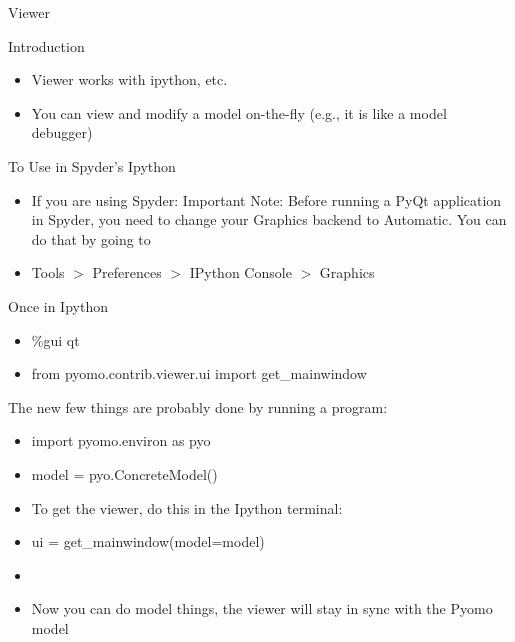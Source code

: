 \documentclass{beamer}
\begin{document}
\begin{frame}{}

\begin{center}
\begin{Large}
Viewer 
\end{Large}
\end{center}
\end{frame}

\begin{frame}{Introduction}
  \begin{itemize}
  \item Viewer works with ipython, etc.
  \item You can view and modify a model on-the-fly (e.g., it is like a model debugger)
  \end{itemize}
\end{frame}

\begin{frame}{To Use in Spyder's Ipython}
\begin{itemize}
 \item[] If you are using Spyder: Important Note: Before running a PyQt application in Spyder, you need to change your Graphics backend to Automatic. You can do that by going to
\item [] Tools $>$ Preferences $>$ IPython Console $>$ Graphics
\end{itemize}
\end{frame}

\begin{frame}{Once in Ipython}
\subtitle{From the Viewer readme}

\begin{itemize}
\item \%gui qt 
\item from pyomo.contrib.viewer.ui import get\_mainwindow
\end{itemize}

The new few things are probably done by running a program:
\begin{itemize}
\item[] import pyomo.environ as pyo
\item[] model = pyo.ConcreteModel()
\end{itemize}

\begin{itemize}
\item[] To get the viewer, do this in the Ipython terminal:
\item ui = get\_mainwindow(model=model)
\item[]
\item []Now you can do model things, the viewer will stay in sync with the Pyomo model
\end{itemize}
\end{frame}
\end{document}
